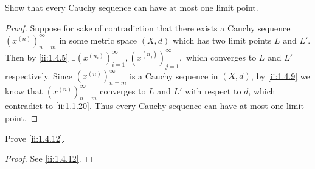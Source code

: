 \begin{ex}\label{ii:ex:1.4.6}
  Show that every Cauchy sequence can have at most one limit point.
\end{ex}

\begin{proof}
  Suppose for sake of contradiction that there exists a Cauchy sequence \((x^{(n)})_{n = m}^\infty\) in some metric space \((X, d)\) which has two limit points \(L\) and \(L'\).
  Then by \cref{ii:1.4.5} \(\exists (x^{(n_i)})_{i = 1}^\infty, (x^{(n_j)})_{j = 1}^\infty,\) which converges to \(L\) and \(L'\) respectively.
  Since \((x^{(n)})_{n = m}^\infty\) is a Cauchy sequence in \((X, d)\), by \cref{ii:1.4.9} we know that \((x^{(n)})_{n = m}^\infty\) converges to \(L\) and \(L'\) with respect to \(d\), which contradict to \cref{ii:1.1.20}.
  Thus every Cauchy sequence can have at most one limit point.
\end{proof}

\begin{ex}\label{ii:ex:1.4.7}
  Prove \cref{ii:1.4.12}.
\end{ex}

\begin{proof}
  See \cref{ii:1.4.12}.
\end{proof}

